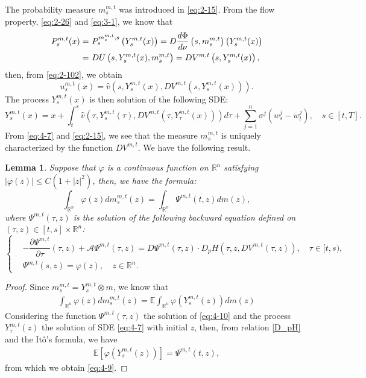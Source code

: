 \documentclass[11pt]{article}
\numberwithin{equation}{section}
\newtheorem{lemma}[theorem]{Lemma}
\newcommand{\e}{\mathbb{E}}
\newcommand{\brn}{{\mathbb{R}^n}}
\newcommand{\1}{\mbox{1\hspace{-1mm}I}}
\begin{document}
The probability measure $m^{m,t}_s$ was introduced in \eqref{eq:2-15}. From the flow property, \eqref{eq:2-26} and \eqref{eq:3-1}, we know that
\begin{align}
    P^{m,t}_s(x)=\ & P^{m^{m,t}_s,s}_s\left(Y^{m,t}_s(x)\right)=D\dfrac{d\Phi}{d\nu}\left(s,m^{m,t}_s\right)\left(Y^{m,t}_s(x)\right) \notag \\
    =\ & DU\left(s,Y^{m,t}_s(x),m^{m,t}_s\right)=DV^{m,t}\left(s,Y^{m,t}_s(x)\right), \label{P_DV}
\end{align}
then, from \eqref{eq:2-102}, we obtain 
\begin{equation*}
    u^{m,t}_s(x)=\widehat{v}\left(s,Y^{m,t}_s(x),DV^{m,t}\left(s,Y^{m,t}_s(x)\right) \right).
\end{equation*}
The process $Y^{m,t}_s(x)$ is then solution of the following SDE:
\begin{equation}\label{eq:4-7}
    Y^{m,t}_s(x)=x+\int_t^s \widehat{v}\left(\tau,Y^{m,t}_s(\tau),DV^{m,t}\left(\tau, Y^{m,t}_\tau(x)\right)\right)d\tau + \sum_{j=1}^{n}\sigma^{j}\left(w^{j}_s-w^{j}_t \right),\quad s\in[t,T].
\end{equation}
From \eqref{eq:4-7} and \eqref{eq:2-15}, we see that the measure $m^{m,t}_s$ is uniquely characterized by
the function $DV^{m,t}$. We have the following result. 

\begin{lemma}\label{lem4-1}
Suppose that $\varphi$ is a continuous function on $\brn$ satisfying $|\varphi(z)|\le C\left(1+|z|^{2}\right)$, then, we have the formula:
\begin{equation}\label{eq:4-9}
    \int_{\brn}\varphi(z)dm^{m,t}_s(z)=\int_{\brn}\Psi^{m,t}(t,z)dm(z),
\end{equation}
where $\Psi^{m,t}(\tau,z)$ is the solution of the following backward equation defined on $(\tau,z)\in[t,s]\times\brn$:
\begin{equation}\label{eq:4-10}
\left\{
    \begin{aligned}
        &-\dfrac{\partial\Psi^{m,t}}{\partial\tau}(\tau,z)+\mathcal{A}\Psi^{m,t}(\tau,z)=D\Psi^{m,t}(\tau,z)\cdot D_p H\left(\tau,z,DV^{m,t}(\tau,z)\right),\quad \tau\in[t,s),\\
        &\Psi^{m,t}(s,z)=\varphi(z),\quad z\in\brn.
    \end{aligned}
\right.
\end{equation}
\end{lemma}

\begin{proof}
Since $m^{m,t}_s=Y^{m,t}_s\otimes m$, we know that
\begin{align*}
    \int_{\brn}\varphi(z)dm^{m,t}_s(z)=\e\int_{\brn} \varphi\left(Y^{m,t}_s(z)\right)dm(z)
\end{align*}
Considering the function $\Psi^{m,t}(\tau,z)$ the solution of \eqref{eq:4-10} and the process $Y^{m,t}_\tau(z)$ the solution of SDE \eqref{eq:4-7} with initial $z$, then, from relation \eqref{D_pH} and the It\^o's formula, we have 
\begin{align*}
    \e\left[\varphi\left(Y^{m,t}_s(z)\right)\right]=\Psi^{m,t}(t,z),
\end{align*}
from which we obtain \eqref{eq:4-9}.
\end{proof}
\end{document}
